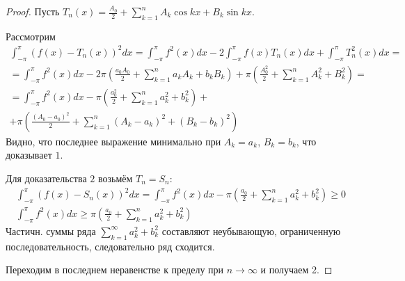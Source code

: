 \documentclass{article}
\begin{document}
\begin{proof}
  Пусть $T_n(x)=\frac{A_0}{2}+\sum_{k=1}^{n}A_k\cos kx + B_k\sin kx$.

  Рассмотрим
  \begin{gather*}
    \int_{-\pi}^{\pi}(f(x)-T_n(x))^{2}dx=\int_{-\pi}^{\pi}f^{2}(x)dx - 2\int_{-\pi}^{\pi}f(x)T_n(x)dx+\int_{-\pi}^{\pi}T_n^{2}(x)dx = \\ 
    = \int_{-\pi}^{\pi} f^{2}(x)dx -2\pi (\frac{a_0A_0}{2}+\sum_{k=1}^{n}a_kA_k+b_kB_k)+\pi(\frac{A_0^{2}}{2}+\sum_{k=1}^{n}A_k^{2}+B_k^{2})= \\ 
    = \int_{-\pi}^{\pi}f^{2}(x)dx-\pi\left(\frac{a_0^{2}}{2}+\sum_{k=1}^{n}a_k^{2}+b_k^{2}\right) +\\
    +\pi\left(\frac{(A_0-a_0)^{2}}{2}+\sum_{k=1}^{n}(A_k-a_k)^{2}+(B_k-b_k)^{2}\right)
  \end{gather*}
  Видно, что последнее выражение минимально при $A_k=a_k$, $B_k=b_k$,
  что доказывает $1$.

  Для доказательства $2$ возьмём $T_n=S_n$:
  \begin{gather*}
    \int_{-\pi}^{\pi}(f(x)-S_n(x))^{2}dx=\int_{-\pi}^{\pi}f^{2}(x)dx-\pi\left(\frac{a_0}{2}+\sum_{k=1}^{n}a_k^{2}+b_k^{2}\right) \ge 0\\
    \int_{-\pi}^{\pi}f^{2}(x)dx \ge \pi\left(\frac{a_0}{2}+\sum_{k=1}^{n}a_k^{2}+b_k^{2}\right)
  \end{gather*}
  Частичн. суммы ряда $\sum_{k=1}^{\infty}a_k^{2}+b_k^{2}$ составляют неубывающую,
  ограниченную последовательность, следовательно ряд сходится.

  Переходим в последнем неравенстве к пределу при $n\to\infty$ и получаем 2.
\end{proof}
\end{document}
